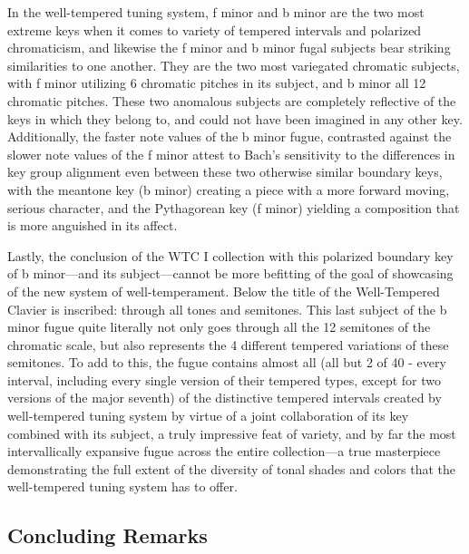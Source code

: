 In the well-tempered tuning system, f minor and b minor are the two most
extreme keys when it comes to variety of tempered intervals and
polarized chromaticism, and likewise the f minor and b minor fugal
subjects bear striking similarities to one another. They are the two
most variegated chromatic subjects, with f minor utilizing 6 chromatic
pitches in its subject, and b minor all 12 chromatic pitches. These two
anomalous subjects are completely reflective of the keys in which they
belong to, and could not have been imagined in any other key.
Additionally, the faster note values of the b minor fugue, contrasted
against the slower note values of the f minor attest to Bach's
sensitivity to the differences in key group alignment even between these
two otherwise similar boundary keys, with the meantone key (b minor)
creating a piece with a more forward moving, serious character, and the
Pythagorean key (f minor) yielding a composition that is more anguished
in its affect.

Lastly, the conclusion of the WTC I collection with this polarized
boundary key of b minor---and its subject---cannot be more
befitting of the goal of showcasing of the new system of
well-temperament. Below the title of the Well-Tempered Clavier is
inscribed: through all tones and semitones. This last subject of the b
minor fugue quite literally not only goes through all the 12 semitones
of the chromatic scale, but also represents the 4 different tempered
variations of these semitones. To add to this, the fugue contains almost
all (all but 2 of 40 - every interval, including every single version of
their tempered types, except for two versions of the major seventh) of
the distinctive tempered intervals created by well-tempered tuning
system by virtue of a joint collaboration of its key combined with its
subject, a truly impressive feat of variety, and by far the most
intervallically expansive fugue across the entire collection---a
true masterpiece demonstrating the full extent of the diversity of tonal
shades and colors that the well-tempered tuning system has to offer.



    \begin{center}
    \end{center}
    
    \subsection{Concluding Remarks}\label{concluding-remarks}

